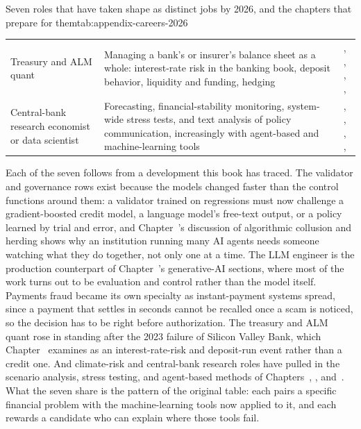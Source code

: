 \documentclass[../ai_in_finance]{subfiles}
\begin{document}
\begin{booktable}[htbp]{Seven roles that have taken shape as distinct jobs by 2026, and the chapters that prepare for them}{tab:appendix-careers-2026}
\begin{tabular}{L{3.4cm}L{5.6cm}L{3.4cm}}
Treasury and ALM quant & Managing a bank's or insurer's balance sheet as a whole: interest-rate risk in the banking book, deposit behavior, liquidity and funding, hedging & , , , ,  \\
Central-bank research economist or data scientist & Forecasting, financial-stability monitoring, system-wide stress tests, and text analysis of policy communication, increasingly with agent-based and machine-learning tools & , , , ,  \\
\bottomrule
\end{tabular}
\end{booktable}

Each of the seven follows from a development this book has traced. The validator and governance rows exist because the models changed faster than the control functions around them: a validator trained on regressions must now challenge a gradient-boosted credit model, a language model's free-text output, or a policy learned by trial and error, and Chapter~'s discussion of algorithmic collusion and herding shows why an institution running many AI agents needs someone watching what they do together, not only one at a time. The LLM engineer is the production counterpart of Chapter~'s generative-AI sections, where most of the work turns out to be evaluation and control rather than the model itself. Payments fraud became its own specialty as instant-payment systems spread, since a payment that settles in seconds cannot be recalled once a scam is noticed, so the decision has to be right before authorization. The treasury and ALM quant rose in standing after the 2023 failure of Silicon Valley Bank, which Chapter~ examines as an interest-rate-risk and deposit-run event rather than a credit one. And climate-risk and central-bank research roles have pulled in the scenario analysis, stress testing, and agent-based methods of Chapters~, , and~. What the seven share is the pattern of the original table: each pairs a specific financial problem with the machine-learning tools now applied to it, and each rewards a candidate who can explain where those tools fail.
\end{document}
